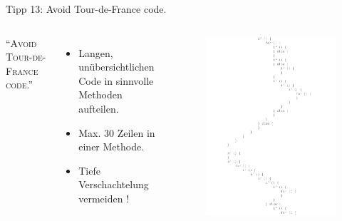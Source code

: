 \documentclass[18pt]{beamer}
\newcommand{\quotes}[1]{``#1''}
\begin{document}
\begin{frame}{Tipp 13: Avoid Tour-de-France code.}
    \begin{columns}[c]
        \begin{block}{}
            \center
            \textsc{\quotes{Avoid Tour-de-France code.}}
        \end{block}
        \begin{itemize}
            \item Langen, unübersichtlichen Code in sinnvolle Methoden aufteilen.
            \item Max. 30 Zeilen in einer Methode.
            \item Tiefe Verschachtelung vermeiden !
        \end{itemize}
        \begin{figure}
            \includegraphics[scale=.3]{img/tourdefrancecode1.png}
        \end{figure}
    \end{columns}
\end{frame}
\end{document}
